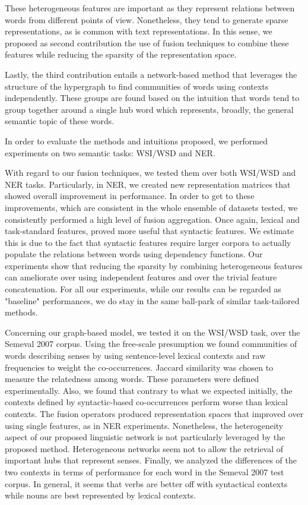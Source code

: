 These heterogeneous features are important as they represent relations between words from different points of view. Nonetheless, they tend to generate sparse representations, as is common with text representations. In this sense, we proposed  as second contribution the use of fusion techniques to combine these features while reducing the sparsity of the representation space. 

Lastly, the third contribution entails a network-based method that leverages the structure of the hypergraph to find communities of words using contexts independently. These groups are found based on the intuition that words tend to group together around a single hub word which represents, broadly, the general semantic topic of these words.


In order to evaluate the methods and intuitions proposed, we performed experiments on two semantic tasks: WSI/WSD and NER.



With regard to our fusion techniques, we tested them over both WSI/WSD and NER tasks. Particularly, in NER, we created new representation matrices that showed overall improvement in performance. In order to get to these improvements, which are consistent in the whole ensemble of datasets tested, we consistently performed a high level of fusion aggregation. Once again, lexical and task-standard features, proved more useful that syntactic features. We estimate this is due to the fact that syntactic features require larger corpora to actually populate the relations between words using dependency functions. Our experiments show that reducing the sparsity by combining heterogeneous features can ameliorate over using independent features and over the trivial feature concatenation. For all our experiments, while our results can be regarded as "baseline" performances, we do stay in the same ball-park of similar task-tailored methods.

Concerning our graph-based model, we tested it on the WSI/WSD task, over the Semeval 2007 corpus. Using the free-scale presumption we found communities of words describing senses by using sentence-level lexical contexts and raw frequencies to weight the co-occurrences. Jaccard similarity was chosen to measure the relatedness among words. These parameters were defined experimentally. Also, we found that contrary to what we expected initially, the contexts defined by syntactic-based co-occurrences perform worse than lexical contexts. The fusion operators produced representation spaces that improved over using single features, as in NER experiments. Nonetheless, the heterogeneity aspect of our proposed linguistic network is not particularly leveraged by the proposed method. Heterogeneous networks seem not to allow the retrieval of important hubs that represent senses. Finally, we analyzed the differences of the two contexts in terms of performance for each word in the Semeval 2007 test corpus. In general, it seems that verbs are better off with syntactical contexts while nouns are best represented by lexical contexts. 

